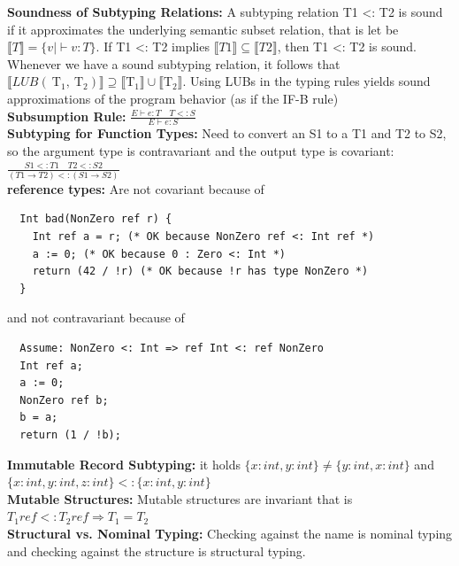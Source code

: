 \documentclass[10pt,landscape]{article}
\begin{document}
\begin{multicols}{3}
\textbf{Soundness of Subtyping Relations:} A subtyping relation T1 <: T2 is sound if it approximates the underlying
semantic subset relation, that is let be $\llbracket T \rrbracket=\{v \mid \vdash v: T\}$. If T1 <: T2 implies $\llbracket T1 \rrbracket \subseteq  \llbracket T2 \rrbracket$, then T1 <: T2 is sound.
Whenever we have a sound subtyping relation, it follows that $\llbracket L U B\left(\mathrm{~T}_1, \mathrm{~T}_2\right) \rrbracket \supseteq \llbracket \mathrm{T}_1 \rrbracket \cup \llbracket \mathrm{T}_2 \rrbracket$.
Using LUBs in the typing rules yields sound approximations of the program behavior (as if the IF-B rule)\\
\textbf{Subsumption Rule:} $\frac{E \vdash e : T \quad  T <:  S}{E \vdash e : S}$\\
\textbf{Subtyping for Function Types:} Need to convert an S1 to a T1 and T2 to S2, so the argument type is
contravariant and the output type is covariant: $\frac{S1 <: T1 \quad T2 <: S2}{(T1 \rightarrow T2) <: (S1 \rightarrow S2)}$\\
\textbf{reference types:} Are not covariant because of 
\begin{verbatim}
  Int bad(NonZero ref r) {
    Int ref a = r; (* OK because NonZero ref <: Int ref *)
    a := 0; (* OK because 0 : Zero <: Int *)
    return (42 / !r) (* OK because !r has type NonZero *)
  }
\end{verbatim}
and not contravariant because of 
\begin{verbatim}
  Assume: NonZero <: Int => ref Int <: ref NonZero
  Int ref a;
  a := 0;
  NonZero ref b;
  b = a;
  return (1 / !b); 
\end{verbatim}
\textbf{Immutable Record Subtyping:} it holds $\{x:int, y :int\} \neq \{y:int, x:int\}$ and $\{x:int, y :int, z:int\} <: \{x:int, y :int\}$\\
\textbf{Mutable Structures:} Mutable structures are invariant that is $T_1 ref <: T_2 ref \Longrightarrow T_1 = T_2$\\
\textbf{Structural vs. Nominal Typing:} Checking against the name is nominal typing and checking against the structure is structural typing.

\end{multicols}
\end{document}
